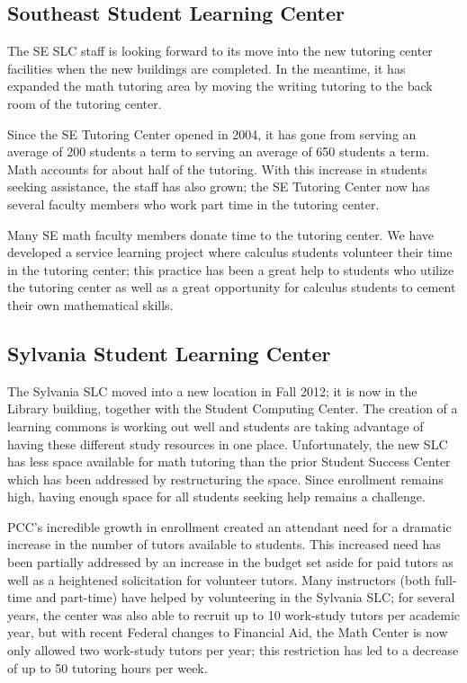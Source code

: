 \subsection{Southeast Student Learning Center}
The SE SLC staff is looking forward to its move into the new tutoring center
facilities when the new buildings are completed. In the meantime, it has
expanded the math tutoring area by moving the writing tutoring to the back room
of the tutoring center.  

Since the SE Tutoring Center opened in 2004, it has gone from serving an
average of 200 students a term to serving an average of 650 students a term.
Math accounts for about half of the tutoring.  With this increase in students
seeking assistance, the staff has also grown; the SE Tutoring Center now has several faculty
members who work part time in the tutoring center. 

Many SE math faculty members donate time to the tutoring center. We have
developed a service learning project where calculus students volunteer their
time in the tutoring center; this practice has been a great help to
students who utilize the tutoring center as well as a great opportunity for
calculus students to cement their own mathematical skills.

\subsection{Sylvania Student Learning Center}
The Sylvania SLC moved into a new location in Fall 2012; it is now in
the Library building, together with the Student Computing Center. The creation
of a learning commons is working out well and students are taking advantage of
having these different study resources in one place. Unfortunately, the new SLC
has less space available for math tutoring than the prior Student Success Center
which has been addressed by restructuring the space. Since enrollment remains high, having enough space
for all students seeking help remains a challenge.

PCC's incredible growth in enrollment created an attendant need for a dramatic
increase in the number of tutors available to students. This increased need has
been partially addressed by an increase in the budget set aside for paid tutors
as well as a heightened solicitation for volunteer tutors. Many
instructors (both full-time and part-time) have helped by volunteering in the
Sylvania SLC; for several years, the center was also able to recruit up to 10
work-study tutors per academic year, but with recent Federal changes to
Financial Aid, the Math Center is now only allowed two work-study tutors per
year; this restriction has led to a decrease of up to 50 tutoring hours per
week.

